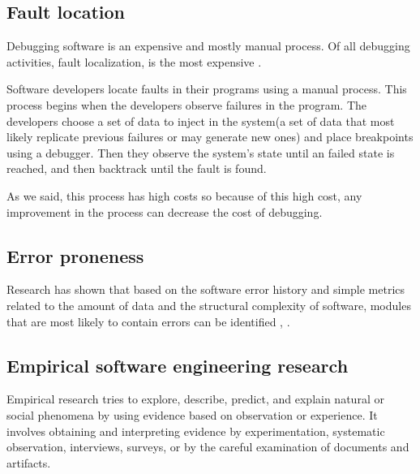 \subsection{Fault location}
Debugging software is an expensive and mostly manual process. Of all debugging activities, fault localization, is the most expensive \cite{articleDebugging}. 

Software developers locate faults in their programs using a manual process. This process begins when the developers observe failures in the program. The developers choose a set of data to inject in the system(a set of data that most likely replicate previous failures or may generate new ones) and place breakpoints using a debugger. Then they observe the system's state until an failed state is reached, and then backtrack until the fault is found. 

As we said, this process has high costs so because of this high cost, any improvement in the process can decrease the cost of debugging.\cite{fault-localization} \cite{program-failures}


\subsection{Error proneness}
Research has shown that based on the software error history and simple metrics related to the amount of data and the structural complexity of software,
modules that are most likely to contain errors can be identified \cite{67595}, \cite{1702015}.


\subsection{Empirical software engineering research}
Empirical research tries to explore, describe, predict, and explain natural or social phenomena by using evidence based on observation or experience.
It involves obtaining and interpreting evidence by experimentation, systematic observation, interviews, surveys, or by the careful examination of documents and artifacts. \cite{inproceedingsEmpirical}
